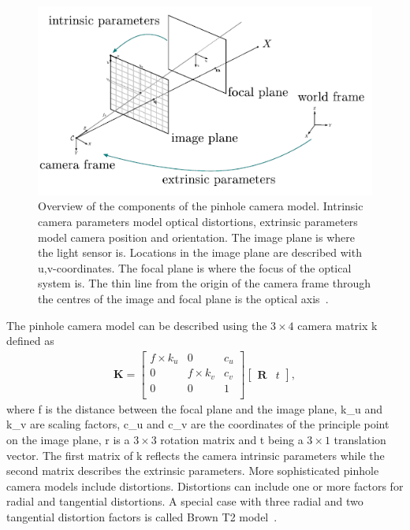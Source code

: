 \begin{figure}[htb]
    \centering
    \includegraphics[width=.85\textwidth]{doc/thesis/0_figures/sfm/pinholeCamera.png}
    \caption{Overview of the components of the pinhole camera model. Intrinsic camera parameters model optical distortions, extrinsic parameters model camera position and orientation. The image plane is where the light sensor is. Locations in the image plane are described with u,v-coordinates. The focal plane is where the focus of the optical system is. The thin line from the origin of the camera frame through the centres of the image and focal plane is the optical axis~\cite{OpenMVGCameras}.}
    \label{fig:pinhole_cam}
\end{figure} 

The pinhole camera model can be described using the $3\times4$ camera matrix \gls{k} defined as
\begin{align}
    \textbf{K} = \begin{bmatrix}
        f\times k_u & 0           & c_u \\
        0           & f\times k_v & c_v \\
        0           & 0           & 1   \\
    \end{bmatrix} 
    \begin{bmatrix}
        \textbf{R} & t
    \end{bmatrix}, \label{eq:camera_m}
\end{align}
where \gls{f} is the distance between the focal plane and the image plane, \gls{k_u} and \gls{k_v} are scaling factors, \gls{c_u} and \gls{c_v} are the coordinates of the principle point on the image plane, \gls{r} is a $3\times3$ rotation matrix and \gls{t} being a $3\times1$ translation vector. The first matrix of \gls{k} reflects the camera intrinsic parameters while the second matrix describes the extrinsic parameters.
More sophisticated pinhole camera models include distortions. Distortions can include one or more factors for radial and tangential distortions. A special case with three radial and two tangential distortion factors is called Brown T2 model~\cite{OpenMVGCameras, sturmCameraModel}.

